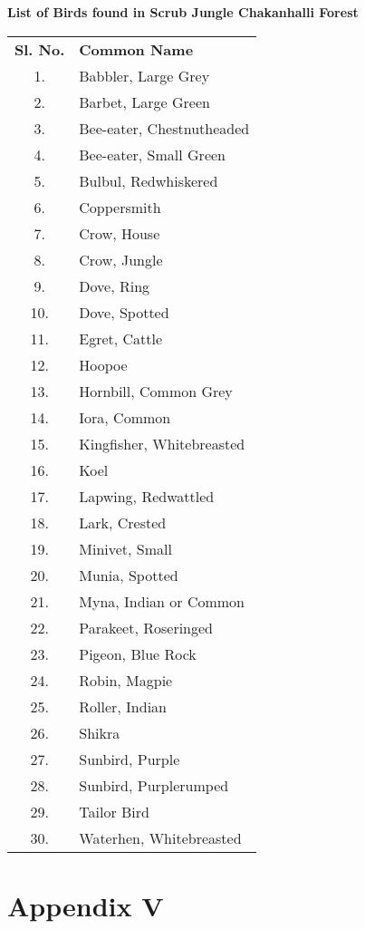 \begin{center}
\smallskip
\textbf{List of Birds found in Scrub Jungle Chakanhalli Forest}
\end{center}
{\renewcommand{\arraystretch}{1.1}
\begin{longtable}{cl}
\textbf{Sl. No.} & \textbf{Common Name}\\
1. &Babbler, Large Grey \\
2. &Barbet, Large Green \\
3. &Bee-eater, Chestnutheaded \\
4. &Bee-eater, Small Green \\
5. &Bulbul, Redwhiskered \\
6. &Coppersmith \\
7. &Crow, House \\
8. &Crow, Jungle \\
9. &Dove, Ring \\
10.& Dove, Spotted \\
11.& Egret, Cattle \\
12.& Hoopoe \\
13. &Hornbill, Common Grey \\
14. &Iora, Common \\
15. &Kingfisher, Whitebreasted \\
16. &Koel \\
17. &Lapwing, Redwattled \\
18. &Lark, Crested \\
19. &Minivet, Small \\
20. &Munia, Spotted \\
21. &Myna, Indian or Common \\
22. &Parakeet, Roseringed \\
23. &Pigeon, Blue Rock \\
24. &Robin, Magpie \\
25. &Roller, Indian \\
26. &Shikra \\
27. &Sunbird, Purple \\
28. &Sunbird, Purplerumped \\
29. &Tailor Bird \\
30. &Waterhen, Whitebreasted 
\end{longtable}}

\newpage

\chapter*{Appendix V}

